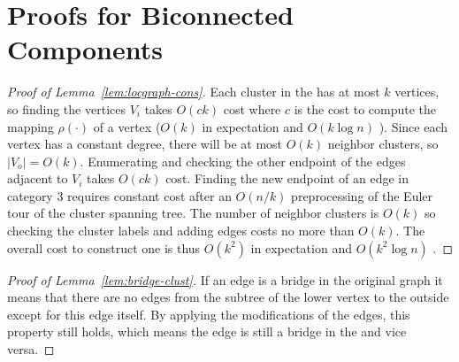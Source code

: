 \section{Proofs for Biconnected Components}\label{sec:appendix-bcc}

\begin{proof}[Proof of Lemma~\ref{lem:locgraph-cons}]
Each cluster in the \implicit{} has at most $k$ vertices, so finding the vertices $V_i$ takes $O(ck)$ cost where $c$ is the cost to compute the mapping $\rho(\cdot)$ of a vertex ($O(k)$ in expectation and $O(k\log n)$ \whp{}).  Since each vertex has a constant degree, there will be at most $O(k)$ neighbor clusters, so $|V_o|=O(k)$.   Enumerating and checking the other endpoint of the edges adjacent to $V_i$ takes $O(ck)$ cost.  Finding the new endpoint of an edge in category 3 requires constant cost after an $O(n/k)$ preprocessing of the Euler tour of the cluster spanning tree.  The number of neighbor clusters is $O(k)$ so checking the cluster labels and adding edges costs no more than $O(k)$.
The overall cost to construct one \localgraph{} is thus $O(k^2)$ in expectation and $O(k^2\log n)$ \whp{}.
\end{proof}

\begin{proof}[Proof of Lemma~\ref{lem:bridge-clust}]
If an edge is a bridge in the original graph it means that there are no edges from the subtree of the lower vertex to the outside except for this edge itself.  By applying the modifications of the edges, this property still holds, which means the edge is still a bridge in the \localgraph{} and vice versa.
\end{proof}
